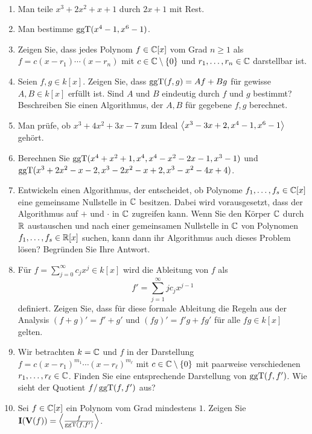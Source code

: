 \documentclass[11pt]{article}
\numberwithin{equation}{section}
\begin{document}
\begin{aufgaben}{\ }
\begin{enumerate}
	\item Man teile $x^3 + 2 x^2  + x + 1$ durch $2 x + 1$ mit Rest. 
	\item Man bestimme $\operatorname{ggT}(x^4-1,x^6-1)$. 
	\item Zeigen Sie, dass jedes Polynom $f \in \mathbb{C}[x]$ vom Grad $n \ge 1$ als $f = c(x - r_1) \cdots (x-r_n)$ mit $c \in \mathbb{C} \setminus \{0\}$ und $r_1,\ldots,r_n \in \mathbb{C}$ darstellbar ist. 
	\item Seien $f,g \in k[x]$. Zeigen Sie, dass $ \operatorname{ggT}(f,g) = A f + B g$ für gewisse $A, B \in k[x]$ erfüllt ist. Sind $A$ und $B$ eindeutig durch $f$ und $g$ bestimmt? Beschreiben Sie einen Algorithmus, der $A,B$ für gegebene $f,g$ berechnet. 
	\item Man prüfe, ob $x^3+ 4 x^2 + 3 x -7$ zum Ideal $\left< x^3 - 3 x + 2, x^4 - 1, x^6 -1 \right>$ gehört.
	\item Berechnen Sie $\operatorname{ggT} ( x^4 + x^2 + 1, x^4 , x^4 - x^2  - 2 x - 1, x^3 -1 )$ und $\operatorname{ggT}(x^3 + 2 x^2 - x -2, x^3 - 2 x^2 - x + 2, x^3 - x^2 - 4x + 4)$. 
	\item Entwickeln einen Algorithmus, der entscheidet, ob Polynome $f_1,\ldots,f_s \in \mathbb{C}[x]$ eine gemeinsame Nullstelle in $\mathbb{C}$ besitzen. Dabei wird vorausgesetzt, dass der Algorithmus auf $+$ und $\cdot$ in $\mathbb{C}$ zugreifen kann. Wenn Sie den Körper $\mathbb{C}$ durch $\mathbb{R}$ austauschen und nach einer gemeinsamen Nullstelle in $\mathbb{C}$ von Polynomen $f_1,\ldots,f_s \in \mathbb{R}[x]$ suchen, kann dann ihr Algorithmus auch dieses Problem lösen? Begründen Sie Ihre Antwort. 
	\item Für $f  = \sum_{j=0}^\infty c_j x^j \in k[x]$  wird die Ableitung von $f$ als 
	\[
		f' = \sum_{j = 1}^\infty  j c_j x^{j-1} 
	\]
	definiert. Zeigen Sie, dass für diese formale Ableitung die Regeln aus der Analysis $(f+ g)' = f' + g' $ und $(f g)' = f' g + f g'$ für alle $f g \in k[x]$ gelten. 
	\item 
	Wir betrachten  $k=\mathbb{C}$ und $f$ in der Darstellung $f = c (x- r_1) ^{m_1} \cdots (x-r_\ell)^{m_\ell}$ mit $c \in \mathbb{C} \setminus \{0\}$ mit paarweise verschiedenen $r_1,\ldots,r_\ell \in \mathbb{C}$. Finden Sie eine entsprechende Darstellung von $\operatorname{ggT}(f,f')$. Wie sieht der Quotient $f / \operatorname{ggT}(f,f')$ aus? 
	\item Sei $f  \in \mathbb{C}[x]$ ein Polynom vom Grad mindestens $1$. Zeigen Sie $\mathbf{I}(\mathbf{V}(f)) = \left< \frac{f}{\operatorname{ggT}(f,f')}  \right>$. 
\end{enumerate} 
\end{aufgaben} 
\end{document}
